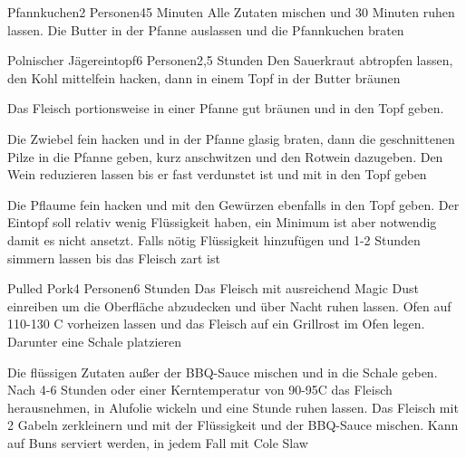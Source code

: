 
\begin{recipe}{Pfannkuchen}{2 Personen}{45 Minuten}
Alle Zutaten mischen und 30 Minuten ruhen lassen. Die Butter in der Pfanne auslassen und die Pfannkuchen braten
\end{recipe}


\begin{recipe}{Polnischer Jägereintopf}{6 Personen}{2,5 Stunden}
Den Sauerkraut abtropfen lassen, den Kohl mittelfein hacken, dann in einem Topf in der Butter bräunen

Das Fleisch portionsweise in einer Pfanne gut bräunen und in den Topf geben.

Die Zwiebel fein hacken und in der Pfanne glasig braten, dann die geschnittenen Pilze in die Pfanne geben, kurz anschwitzen und den Rotwein dazugeben. Den Wein reduzieren lassen bis er fast verdunstet ist und mit in den Topf geben


Die Pflaume fein hacken und mit den Gewürzen ebenfalls in den Topf geben. Der Eintopf soll relativ wenig Flüssigkeit haben, ein Minimum ist aber notwendig damit es nicht ansetzt. Falls nötig Flüssigkeit hinzufügen und 1-2 Stunden simmern lassen bis das Fleisch zart ist
\end{recipe}


\begin{recipe}{Pulled Pork}{4 Personen}{6 Stunden}
Das Fleisch mit ausreichend Magic Dust einreiben um die Oberfläche abzudecken und über Nacht ruhen lassen. Ofen auf 110-130 \0C  vorheizen lassen und das Fleisch auf ein Grillrost im Ofen legen. Darunter eine Schale platzieren


Die flüssigen Zutaten außer der BBQ-Sauce mischen und in die Schale  geben.
Nach 4-6 Stunden oder einer Kerntemperatur von 90-95\0C das Fleisch herausnehmen, in Alufolie wickeln und eine Stunde ruhen lassen.
Das Fleisch mit 2 Gabeln zerkleinern und mit der Flüssigkeit und der BBQ-Sauce mischen.
Kann auf Buns serviert werden, in jedem Fall mit Cole Slaw
\end{recipe}

